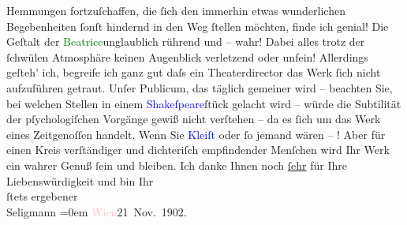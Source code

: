                Hemmungen fortzuſchaffen, die ſich den immerhin etwas wunderlichen Begebenheiten
               ſonſt hindernd in den Weg ſtellen möchten, finde ich genial! Die Geſtalt der \textcolor{green}{Beatrice}{}unglaublich rührend und – wahr! Dabei
               alles trotz der ſchwülen Atmosphäre keinen Augenblick verletzend oder unfein!
               Allerdings geſteh’ ich, begreife ich ganz gut daſs ein Theaterdirector das Werk ſich
               nicht aufzuführen getraut. Unſer Publicum, das täglich gemeiner wird – beachten Sie,
               bei welchen Stellen in einem \textcolor{blue}{Shakeſpeare}{}\ledrightnote{\textcolor{blue}{William Shakespeare}}ſtück
               gelacht wird – würde die Subtilität der pſychologiſchen Vorgänge gewiß nicht
               verſtehen – da es ſich um das Werk eines Zeitgenoſſen handelt. Wenn Sie {\pb}\textcolor{blue}{Kleiſt}{}\ledrightnote{\textcolor{blue}{Heinrich von Kleist}} oder ſo jemand wären – \textsc{\label{K_L01250_2v}\label{K_L01250_2h}}! Aber für einen Kreis verſtändiger und dichteriſch empfindender Menſchen wird
               Ihr Werk ein wahrer Genuß ſein und bleiben. Ich danke Ihnen noch \uline{ſehr} für Ihre Liebenswürdigkeit und\pend
           \pstart
           bin Ihr{\\[\baselineskip]}ſtets ergebener{\\[\baselineskip]}\spacefill\mbox{Seligmann}\pend
           \leftskip=0em{}\pstart
           \textcolor{pink}{Wien}{}\ledrightnote{\textcolor{pink}{Wien}}{ }21 Nov. 1902.\pend
           \endnumbering{}  
      